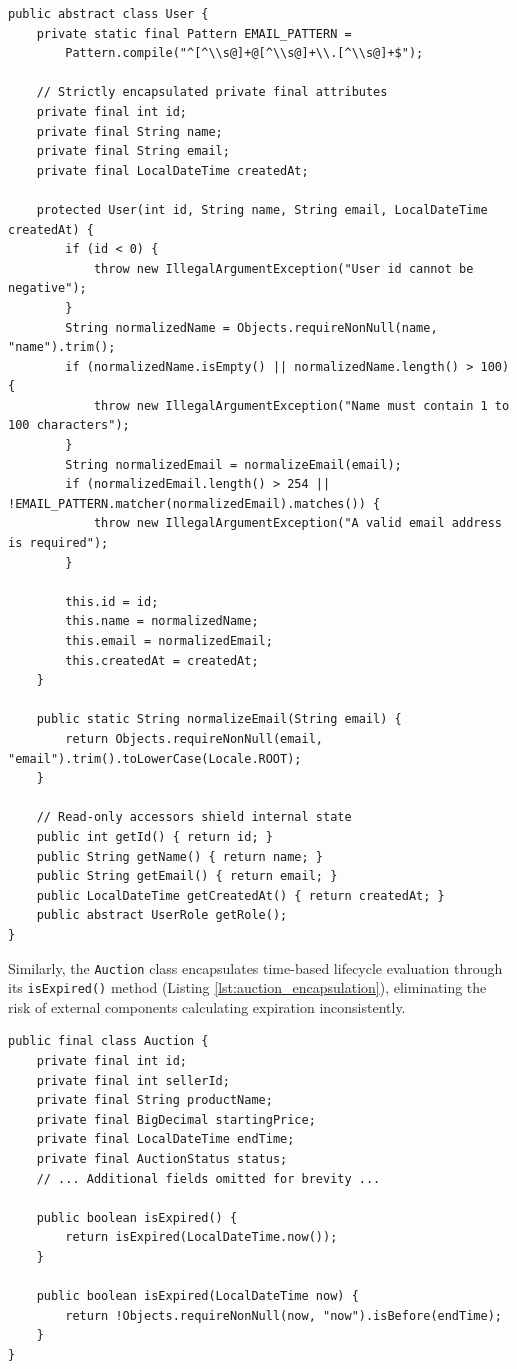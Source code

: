 \begin{lstlisting}[caption={Encapsulation and Invariant Checking in \texttt{User.java}}, label={lst:user_encapsulation}]
public abstract class User {
    private static final Pattern EMAIL_PATTERN = 
        Pattern.compile("^[^\\s@]+@[^\\s@]+\\.[^\\s@]+$");

    // Strictly encapsulated private final attributes
    private final int id;
    private final String name;
    private final String email;
    private final LocalDateTime createdAt;

    protected User(int id, String name, String email, LocalDateTime createdAt) {
        if (id < 0) {
            throw new IllegalArgumentException("User id cannot be negative");
        }
        String normalizedName = Objects.requireNonNull(name, "name").trim();
        if (normalizedName.isEmpty() || normalizedName.length() > 100) {
            throw new IllegalArgumentException("Name must contain 1 to 100 characters");
        }
        String normalizedEmail = normalizeEmail(email);
        if (normalizedEmail.length() > 254 || !EMAIL_PATTERN.matcher(normalizedEmail).matches()) {
            throw new IllegalArgumentException("A valid email address is required");
        }

        this.id = id;
        this.name = normalizedName;
        this.email = normalizedEmail;
        this.createdAt = createdAt;
    }

    public static String normalizeEmail(String email) {
        return Objects.requireNonNull(email, "email").trim().toLowerCase(Locale.ROOT);
    }

    // Read-only accessors shield internal state
    public int getId() { return id; }
    public String getName() { return name; }
    public String getEmail() { return email; }
    public LocalDateTime getCreatedAt() { return createdAt; }
    public abstract UserRole getRole();
}
\end{lstlisting}

Similarly, the \texttt{Auction} class encapsulates time-based lifecycle evaluation through its \texttt{isExpired()} method (Listing \ref{lst:auction_encapsulation}), eliminating the risk of external components calculating expiration inconsistently.

\begin{lstlisting}[caption={Encapsulated Domain Logic in \texttt{Auction.java}}, label={lst:auction_encapsulation}]
public final class Auction {
    private final int id;
    private final int sellerId;
    private final String productName;
    private final BigDecimal startingPrice;
    private final LocalDateTime endTime;
    private final AuctionStatus status;
    // ... Additional fields omitted for brevity ...

    public boolean isExpired() {
        return isExpired(LocalDateTime.now());
    }

    public boolean isExpired(LocalDateTime now) {
        return !Objects.requireNonNull(now, "now").isBefore(endTime);
    }
}
\end{lstlisting}

